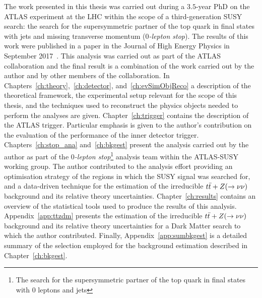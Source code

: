 The work presented in this thesis was carried out during a $3.5$-year PhD on the \acs{ATLAS} experiment at the \ac{LHC} within the scope of a third-generation \ac{SUSY} search: the search for the supersymmetric partner of the top quark in final states with jets and missing transverse momentum (\emph{$0$-lepton stop}). The results of this work were published in a paper in the Journal of High Energy Physics in September 2017~\cite{stop0L}. This analysis was carried out as part of the \acs{ATLAS} collaboration and the final result is a combination of the work carried out by the author and by other members of the collaboration. In Chapters~\ref{ch:theory},~\ref{ch:detector}, and~\ref{ch:evSimObjReco} a description of the theoretical framework, the experimental setup relevant for the scope of this thesis, and the techniques used to reconstruct the physics objects needed to perform the analyses are given. Chapter~\ref{ch:trigger} contains the description of the \acs{ATLAS} trigger. Particular emphasis is given to the author’s contribution on the evaluation of the performance of the inner detector trigger. Chapters~\ref{ch:stop_ana} and~\ref{ch:bkgest} present the analysis carried out by the author as part of the \emph{$0$-lepton stop}\footnote{The search for the supersymmetric partner of the top quark in final states with 0 leptons and jets} analysis team within the \acs{ATLAS}-SUSY working group. The author contributed to the analysis effort providing an optimisation strategy of the regions in which the \ac{SUSY} signal was searched for, and a data-driven technique for the estimation of the irreducible $t\bar{t}+Z (\rightarrow \nu \nu)$ background and its relative theory uncertainties. Chapter~\ref{ch:results} contains an overview of the statistical tools used to produce the results of this analysis. Appendix~\ref{app:ttzdm} presents the estimation of the irreducible $t\bar{t}+Z (\rightarrow \nu \nu)$ background and its relative theory uncertainties for a Dark Matter search to which the author contributed. Finally, Appendix~\ref{app:sumbkgest} is a detailed summary of the selection employed for the background estimation described in Chapter~\ref{ch:bkgest}.